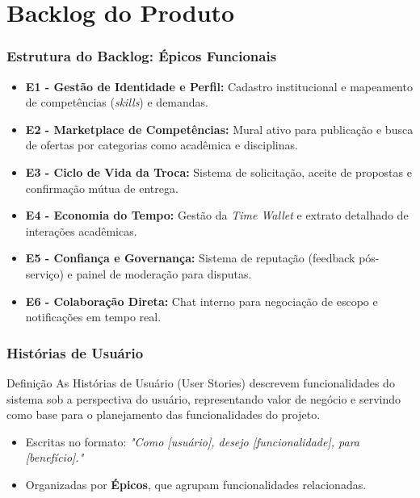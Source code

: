 \documentclass[aspectratio=169]{beamer}
\begin{document}
\section[Backlog do Produto]{Backlog do Produto}
\begin{frame}
\frametitle{Estrutura do Backlog: Épicos Funcionais}
\begin{itemize}
    \item \textbf{E1 - Gestão de Identidade e Perfil:} Cadastro institucional e mapeamento de competências (\textit{skills}) e demandas.
    \item \textbf{E2 - Marketplace de Competências:} Mural ativo para publicação e busca de ofertas por categorias como acadêmica e disciplinas.
    \item \textbf{E3 - Ciclo de Vida da Troca:} Sistema de solicitação, aceite de propostas e confirmação mútua de entrega.
    \item \textbf{E4 - Economia do Tempo:} Gestão da \textit{Time Wallet} e extrato detalhado de interações acadêmicas.
    \item \textbf{E5 - Confiança e Governança:} Sistema de reputação (feedback pós-serviço) e painel de moderação para disputas.
    \item \textbf{E6 - Colaboração Direta:} Chat interno para negociação de escopo e notificações em tempo real.
\end{itemize}
\end{frame}


\begin{frame} \frametitle{Histórias de Usuário} \begin{block}{Definição} As Histórias de Usuário (User Stories) descrevem funcionalidades do sistema sob a perspectiva do usuário, representando valor de negócio e servindo como base para o planejamento das funcionalidades do projeto. \end{block} \begin{itemize} \item Escritas no formato: \textit{"Como [usuário], desejo [funcionalidade], para [benefício]."} \item Organizadas por \textbf{Épicos}, que agrupam funcionalidades relacionadas. \end{itemize} \end{frame}

\small
\end{document}
